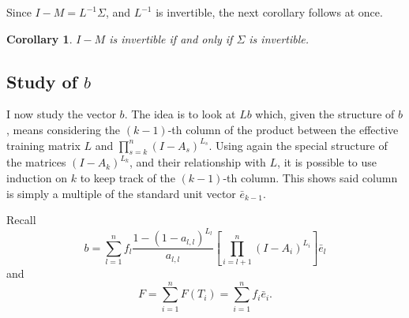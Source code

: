 \documentclass[]{interact}
\theoremstyle{plain}%
\newtheorem{corollary}[theorem]{Corollary}
\theoremstyle{definition}
\theoremstyle{remark}
\begin{document}
Since $I-M=L^{-1}\Sigma$, and $L^{-1}$ is invertible, the next corollary follows at once.

\begin{corollary}
$I-M$ is invertible if and only if $\Sigma$ is invertible.
\end{corollary}

\subsection{Study of $b$}

I now study the vector $b$. The idea is to look at $Lb$ which, given the structure of $b$, means considering the $(k-1)$-th column of the product between the effective training matrix $L$ and $\prod_{s=k}^{n}(I-A_s)^{L_s}$. Using again the special structure of the matrices $(I-A_k)^{L_k}$, and their relationship with $L$, it is possible to use induction on $k$ to keep track of the $(k-1)$-th column. This shows said column is simply a multiple of the standard unit vector $\bar{e}_{k-1}$.

Recall 
\[
b=\sum_{l=1}^nf_l\frac{1-(1-a_{l,l})^{L_l}}{a_{l,l}}\left[ \prod_{i=l+1}^{n}(I-A_i)^{L_i}\right]\bar{e}_l 
\]
and
\[
F=\sum_{i=1}^nF(T_i)=\sum_{i=1}^n f_i\bar{e}_i.
\] 
\end{document}
